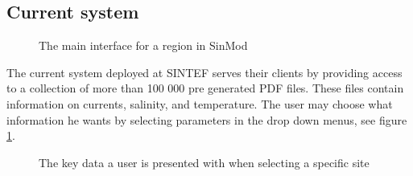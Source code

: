 \documentclass[11pt,a4paper,titlepage,oneside]{report}
\begin{document}
\subsection{Current system}
\begin{figure}[h]
\begin{center}
\caption{The main interface for a region in SinMod}
\label{fig:sinmod-region-main-interface}
\end{center}
\end{figure}

The current system deployed at SINTEF serves their clients by providing access to a collection of more than 100 000 pre generated PDF files. These files contain information on currents, salinity, and temperature. The user may choose what information he wants by selecting parameters in the drop down menus, see figure \ref{fig:sinmod-region-main-interface}.

\begin{figure}[h]
\begin{center}
\caption{The key data a user is presented with when selecting a specific site}
\label{fig:sinmod-site-key-data}
\end{center}
\end{figure}
\end{document}
